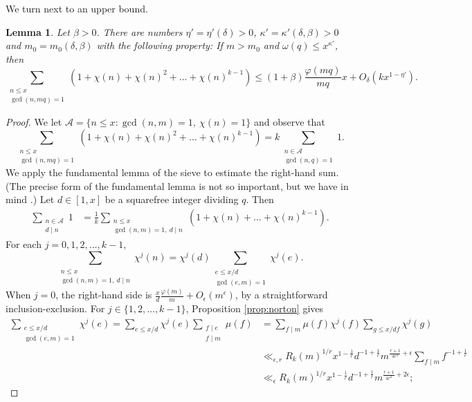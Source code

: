 \documentclass{scrartcl}
\theoremstyle{plain}
\newtheorem{lem}[thm]{Lemma}
\theoremstyle{remark}
\renewcommand{\phi}{\varphi}
\newcommand{\1}{\mathbf{1}}
\newcommand{\sA}{\mathcal{A}}
\begin{document}
We turn next to an upper bound.

\begin{lem}\label{lem:upper} Let $\beta > 0$. There are numbers $\eta' = \eta'(\delta) > 0$, $\kappa' = \kappa'(\delta,\beta)>0$ and $m_0 = m_0(\delta,\beta)$ with the following property: If $m > m_0$ and $\omega(q) \le x^{\kappa'}$, then
\[ \sum_{\substack{n \le x \\ \gcd(n,mq)=1}} (1+\chi(n) + \chi(n)^2 + \dots + \chi(n)^{k-1}) \le (1+\beta) \frac{\phi(mq)}{mq}x +O_{\delta}(k x^{1-\eta'}). \]
\end{lem}
\begin{proof} We let $\sA = \{n \le x: \gcd(n,m)=1,~\chi(n)=1\}$ and observe that
\begin{equation}\label{eq:fundidentity} \sum_{\substack{n \le x \\ \gcd(n,mq)=1}} (1+\chi(n) + \chi(n)^2 + \dots + \chi(n)^{k-1}) = k \sum_{\substack{n \in \sA \\ \gcd(n,q)=1}} 1. \end{equation}
We apply the fundamental lemma of the sieve to estimate the right-hand sum. (The precise form of the fundamental lemma is not so important, but we have in mind \cite[Theorem 4.1, p. 29]{diamond08}.) Let $d \in [1,x]$ be a squarefree integer dividing $q$. Then
\begin{align*} \sum_{\substack{n \in \sA \\ d \mid n}} 1 &= \frac{1}{k} \sum_{\substack{n \le x \\\gcd(n,m)=1,~d\mid n}} (1+\chi(n) + \dots + \chi(n)^{k-1}).
\end{align*}
For each $j=0,1,2,\dots, k-1$,
\[ \sum_{\substack{n \le x \\ \gcd(n,m)=1,~d\mid n}}\chi^j(n) = \chi^j(d) \sum_{\substack{e \le x/d \\ \gcd(e,m)=1}} \chi^j(e). \]
When $j=0$, the right-hand side is $\frac{x}{d}\frac{\phi(m)}{m} +O_{\epsilon}(m^{\epsilon})$, by a straightforward inclusion-exclusion. For $j \in \{1,2,\dots, k-1\}$,  Proposition \ref{prop:norton} gives
\begin{align*} \sum_{\substack{e \le x/d \\ \gcd(e,m)=1}} \chi^j(e) = \sum_{e \le x/d} \chi^j(e) \sum_{\substack{f \mid e \\ f\mid m}} \mu(f) &= \sum_{f \mid m} \mu(f) \chi^j(f) \sum_{g \le x/df} \chi^j(g) \\
&\ll_{\epsilon,r} R_k(m)^{1/r} x^{1-\frac1r} d^{-1+\frac{1}{r}} m^{\frac{r+1}{4r^2}+\epsilon} \sum_{f \mid m} f^{-1+\frac{1}{r}} \\&\ll_{\epsilon} R_k(m)^{1/r} x^{1-\frac1r} d^{-1+\frac{1}{r}} m^{\frac{r+1}{4r^2}+2\epsilon};

\end{align*}
\end{proof}
\end{document}
